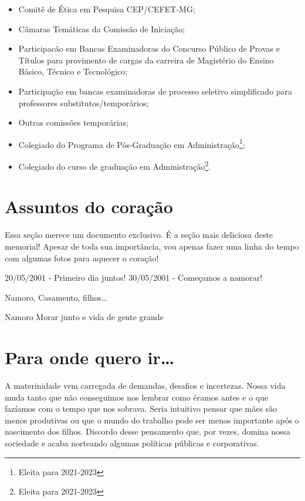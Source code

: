 \documentclass[
]{book}
\begin{document}
\begin{itemize}
\item
  Comitê de Ética em Pesquisa CEP/CEFET-MG;
\item
  Câmaras Temáticas da Comissão de Iniciação;
\item
  Participacão em Bancas Examinadoras do Concurso Público de Provas e
  Títulos para provimento de cargas da carreira de Magistério do
  Ensino Básico, Técnico e Tecnológico;
\item
  Participação em bancas examinadoras de processo seletivo
  simplificado para professores substitutos/temporários;
\item
  Outras comissões temporárias;
\item
  Colegiado do Programa de Pós-Graduação em
  Administração\footnote{Eleita para 2021-2023};
\item
  Colegiado do curso de graduação em Administração\footnote{Eleita para 2021-2023}.
\end{itemize}

\hypertarget{assuntos-do-corauxe7uxe3o}{%
\chapter{Assuntos do coração}\label{assuntos-do-corauxe7uxe3o}}

Essa seção merece um documento exclusivo. É a seção mais deliciosa deste memorial! Apesar de toda sua importância, vou apenas fazer uma linha do tempo com algumas fotos para aquecer o coração!

20/05/2001 - Primeiro dia juntos!
30/05/2001 - Começamos a namorar!

Namoro, Casamento, filhos\ldots{}

Namoro
Morar junto e vida de gente grande

\hypertarget{para-onde-quero-ir}{%
\chapter{Para onde quero ir\ldots{}}\label{para-onde-quero-ir}}

A materinidade vem carregada de demandas, desafios e incertezas. Nossa vida muda tanto que não conseguimos nos lembrar como éramos antes e o que fazíamos com o tempo que nos sobrava. Seria intuitivo pensar que mães são menos produtivas ou que o mundo do trabalho pode ser menos importante após o nascimento dos filhos. Discordo desse pensamento que, por vezes, domina nossa sociedade e acaba norteando algumas políticas públicas e corporativas.
\end{document}
